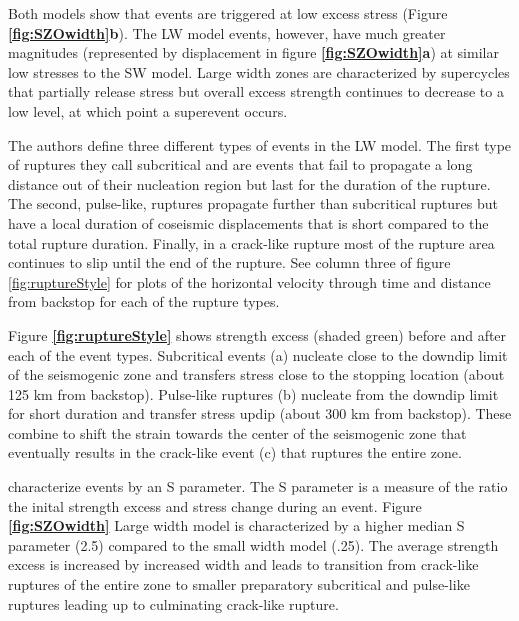 \documentclass[draft,jgrga]{agutex}
\begin{document}
\begin{article}
Both models show that events are triggered at low excess stress (Figure {\bf \ref{fig:SZOwidth}b}). The LW model events, however, have much greater magnitudes (represented by displacement in figure {\bf \ref{fig:SZOwidth}a}) at similar low stresses to the SW model. Large width zones are characterized by supercycles that partially release stress but overall excess strength continues to decrease to a low level, at which point a superevent occurs. 

The authors define three different types of events in the LW model. The first type of ruptures they call subcritical and are events that fail to propagate a long distance out of their nucleation region but last for the duration of the rupture. The second, pulse-like, ruptures propagate further than subcritical ruptures but have a local duration of coseismic displacements that is short compared to the total rupture duration. Finally, in a crack-like rupture most of the rupture area continues to slip until the end of the rupture. See column three of figure \ref{fig:ruptureStyle} for plots of the horizontal velocity through time and distance from backstop for each of the rupture types.

Figure {\bf \ref{fig:ruptureStyle}} shows strength excess (shaded green) before and after each of the event types. Subcritical events (a) nucleate close to the downdip limit of the seismogenic zone and transfers stress close to the stopping location (about 125 km from backstop). Pulse-like ruptures (b) nucleate from the downdip limit for short duration and transfer stress updip (about 300 km from backstop). These combine to shift the strain towards the center of the seismogenic zone that eventually results in the crack-like event (c) that ruptures the entire zone. 

\citet{Herrendorfer2015} characterize events by an S parameter. The S parameter is a measure of the ratio the inital strength excess and stress change during an event. Figure {\bf \ref{fig:SZOwidth}} Large width model is characterized by a higher median S parameter (2.5) compared to the small width model (.25). The average strength excess is increased by increased width and leads to transition from crack-like ruptures of the entire zone to smaller preparatory subcritical and pulse-like ruptures leading up to culminating crack-like rupture. 



\end{article}
\end{document}
